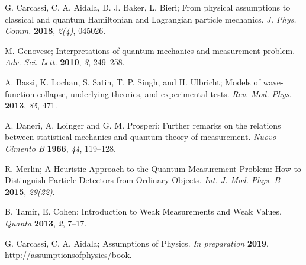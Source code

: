 \documentclass[applsci,article,submit,moreauthors,pdftex]{Definitions/mdpi}
\begin{document}
\begin{thebibliography}{999}

G. Carcassi, C. A. Aidala, D. J. Baker, L. Bieri; From physical assumptions to classical and quantum {Hamiltonian} and {Lagrangian} particle mechanics. {\em J. Phys. Comm.} {\bf 2018}, {\em 2(4)}, 045026.

M. Genovese; Interpretations of quantum mechanics and measurement problem. {\em Adv. Sci. Lett.} {\bf 2010}, {\em 3}, 249--258.

A. Bassi, K. Lochan, S. Satin, T. P. Singh, and H. Ulbricht; Models of wave-function collapse, underlying theories, and experimental tests. {\em Rev. Mod. Phys.} {\bf 2013}, {\em 85}, 471.

A. Daneri, A. Loinger and G. M. Prosperi; Further remarks on the relations between statistical mechanics and quantum theory of measurement. {\em Nuovo Cimento B} {\bf 1966}, {\em 44}, 119--128.

R. Merlin; A Heuristic Approach to the Quantum Measurement Problem: How to Distinguish Particle Detectors from Ordinary Objects. {\em Int. J. Mod. Phys. B} {\bf 2015}, {\em 29(22)}.

B, Tamir, E. Cohen; Introduction to Weak Measurements and Weak Values. {\em Quanta} {\bf 2013}, {\em 2}, 7–17.

G. Carcassi, C. A. Aidala; Assumptions of Physics. {\em In preparation} {\bf 2019}, http://assumptionsofphysics/book.

\end{thebibliography}

\end{document}
